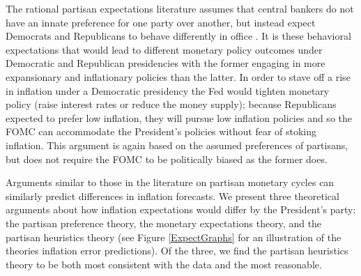 \documentclass[a4paper]{article}\usepackage{graphicx, color}
\begin{document}
The rational partisan expectations literature assumes that central bankers do not have an innate preference for one party over another, but instead expect Democrats and Republicans to behave differently in office \cite{Hibbs1994}. It is these behavioral expectations that would lead to different monetary policy outcomes under Democratic and Republican presidencies with the former engaging in more expansionary and inflationary policies than the latter. In order to stave off a rise in inflation under a Democratic presidency the Fed would tighten monetary policy (raise interest rates or reduce the money supply); because Republicans expected to prefer low inflation, they will pursue low inflation policies and so the FOMC can accommodate the President's policies without fear of stoking inflation. This argument is again based on the assumed preferences of partisans, but does not require the FOMC to be politically biased as the former does. 

Arguments similar to those in the literature on partisan monetary cycles can similarly predict differences in inflation forecasts. We present three theoretical arguments about how inflation expectations would differ by the President's party: the partisan preference theory, the monetary expectations theory, and the partisan heuristics theory (see Figure \ref{ExpectGraphs} for an illustration of the theories inflation error predictions). Of the three, we find the partisan heuristics theory to be both most consistent with the data and the most reasonable.
\end{document}
